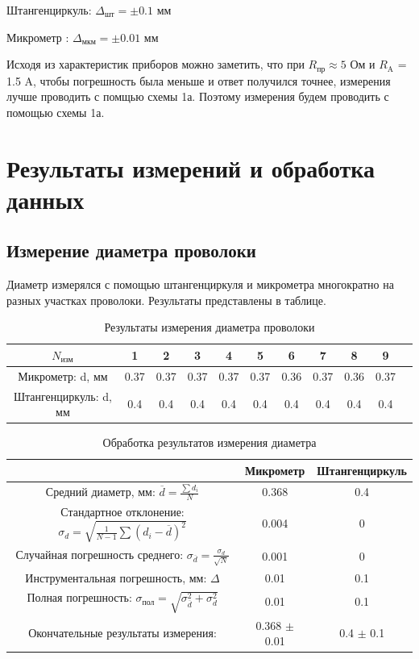 \documentclass[a4paper,12pt]{article}
\begin{document}
Штангенциркуль: $\Delta_{\mbox{шт}} = \pm 0.1$ мм

Микрометр : $\Delta_{\mbox{мкм}} = \pm 0.01$ мм

Исходя из характеристик приборов можно заметить, что при $R_{\mbox{пр}}
\approx 5$ Ом и $R_{\mbox{A}}$ = 1.5 A, чтобы погрешность была меньше и ответ получился точнее, измерения лучше проводить с помщью схемы 1а.
Поэтому измерения будем проводить с помощью схемы 1а.

\section{Результаты измерений и обработка данных}
\subsection{Измерение диаметра проволоки}
Диаметр измерялся с помощью штангенциркуля и микрометра многократно на разных участках проволоки. Результаты представлены в таблице.
\begin{table}[H]
\label{Диаметр}
\caption{Результаты измерения диаметра проволоки}
\begin{tabular}{|c|c|c|c|c|c|c|c|c|c|c|}
\hline
$N_{\mbox{изм}}$ & 1 & 2 & 3 & 4 & 5 & 6 & 7 & 8 & 9\\
\hline
Микрометр: d, мм & 0.37 & 0.37 & 0.37 & 0.37 & 0.37 & 0.36 & 0.37 & 0.36 & 0.37 \\
\hline
Штангенциркуль: d, мм & 0.4 & 0.4 & 0.4 & 0.4 & 0.4 & 0.4 & 0.4 & 0.4 & 0.4 \\
\hline
\end{tabular}
\end{table}

\begin{table}[H]
\centering
\caption{Обработка результатов измерения диаметра}
\begin{tabular}{|c|c|c|}
\hline
 & Микрометр & Штангенциркуль \\
\hline
Средний диаметр, мм: $\overline{d}=\frac{\sum d_i}{N}$ & 0.368 & 0.4 \\
\hline
Стандартное отклонение: $\sigma_d=\sqrt{\frac{1}{N-1}\sum (d_i-\overline{d})^2}$ & 0.004&0 \\
\hline
Случайная погрешность среднего: $\sigma_{\overline{d}}=\frac{\sigma_d}{\sqrt{N}}$ & 0.001 & 0 \\
\hline
Инструментальная погрешность, мм: $\Delta$ & 0.01 & 0.1 \\
\hline
Полная погрешность: $\sigma_{\mbox{пол}}=\sqrt{\sigma_{\overline{d}}^2+\sigma_d^2}$ & 0.01 & 0.1 \\
\hline
Окончательные результаты измерения:  & 0.368 $\pm$ 0.01 & 0.4 $\pm$ 0.1 \\
\hline
\end{tabular}
\end{table}
\end{document}
